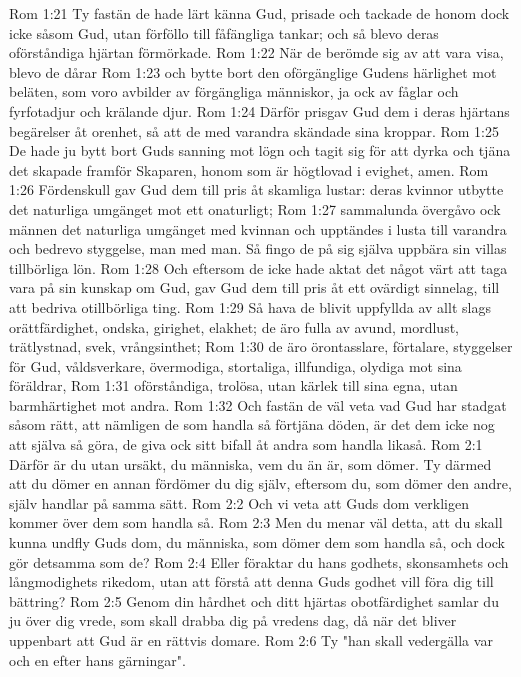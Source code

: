 Rom 1:21  Ty fastän de hade lärt känna Gud, prisade och tackade de honom dock icke såsom Gud, utan förföllo till fåfängliga tankar; och så blevo deras oförståndiga hjärtan förmörkade.
Rom 1:22  När de berömde sig av att vara visa, blevo de dårar
Rom 1:23  och bytte bort den oförgänglige Gudens härlighet mot beläten, som voro avbilder av förgängliga människor, ja ock av fåglar och fyrfotadjur och krälande djur.
Rom 1:24  Därför prisgav Gud dem i deras hjärtans begärelser åt orenhet, så att de med varandra skändade sina kroppar.
Rom 1:25  De hade ju bytt bort Guds sanning mot lögn och tagit sig för att dyrka och tjäna det skapade framför Skaparen, honom som är högtlovad i evighet, amen.
Rom 1:26  Fördenskull gav Gud dem till pris åt skamliga lustar: deras kvinnor utbytte det naturliga umgänget mot ett onaturligt;
Rom 1:27  sammalunda övergåvo ock männen det naturliga umgänget med kvinnan och upptändes i lusta till varandra och bedrevo styggelse, man med man. Så fingo de på sig själva uppbära sin villas tillbörliga lön.
Rom 1:28  Och eftersom de icke hade aktat det något värt att taga vara på sin kunskap om Gud, gav Gud dem till pris åt ett ovärdigt sinnelag, till att bedriva otillbörliga ting.
Rom 1:29  Så hava de blivit uppfyllda av allt slags orättfärdighet, ondska, girighet, elakhet; de äro fulla av avund, mordlust, trätlystnad, svek, vrångsinthet;
Rom 1:30  de äro örontasslare, förtalare, styggelser för Gud, våldsverkare, övermodiga, stortaliga, illfundiga, olydiga mot sina föräldrar,
Rom 1:31  oförståndiga, trolösa, utan kärlek till sina egna, utan barmhärtighet mot andra.
Rom 1:32  Och fastän de väl veta vad Gud har stadgat såsom rätt, att nämligen de som handla så förtjäna döden, är det dem icke nog att själva så göra, de giva ock sitt bifall åt andra som handla likaså.
Rom 2:1  Därför är du utan ursäkt, du människa, vem du än är, som dömer. Ty därmed att du dömer en annan fördömer du dig själv, eftersom du, som dömer den andre, själv handlar på samma sätt.
Rom 2:2  Och vi veta att Guds dom verkligen kommer över dem som handla så.
Rom 2:3  Men du menar väl detta, att du skall kunna undfly Guds dom, du människa, som dömer dem som handla så, och dock gör detsamma som de?
Rom 2:4  Eller föraktar du hans godhets, skonsamhets och långmodighets rikedom, utan att förstå att denna Guds godhet vill föra dig till bättring?
Rom 2:5  Genom din hårdhet och ditt hjärtas obotfärdighet samlar du ju över dig vrede, som skall drabba dig på vredens dag, då när det bliver uppenbart att Gud är en rättvis domare.
Rom 2:6  Ty "han skall vedergälla var och en efter hans gärningar".
